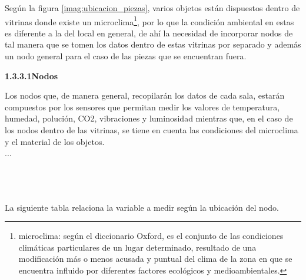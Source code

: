     Según la figura \ref{imag:ubicacion_piezas}, varios objetos están dispuestos dentro de vitrinas donde existe un microclima\footnote{microclima: según el diccionario Oxford, es el conjunto de las condiciones climáticas particulares de un lugar determinado, resultado de una modificación más o menos acusada y puntual del clima de la zona en que se encuentra influido por diferentes factores ecológicos y medioambientales.}, por lo que la condición ambiental en estas es diferente a la del local en general, de ahí la necesidad de incorporar nodos de tal manera que se tomen los datos dentro de estas vitrinas por separado y además un nodo general para el caso de las piezas que se encuentran fuera.\\

        \textbf{1.3.3.1\hspace{5mm}Nodos}

    Los nodos que, de manera general, recopilarán los datos de cada sala, estarán compuestos por los sensores que permitan medir los valores de temperatura, humedad, polución, CO2, vibraciones y luminosidad mientras que, en el caso de los nodos dentro de las vitrinas, se tiene en cuenta las condiciones del microclima y el material de los objetos.\\
    ...\\\\\\\\

    \vspace{3cm}

    La siguiente tabla relaciona la variable a medir según la ubicación del nodo.


